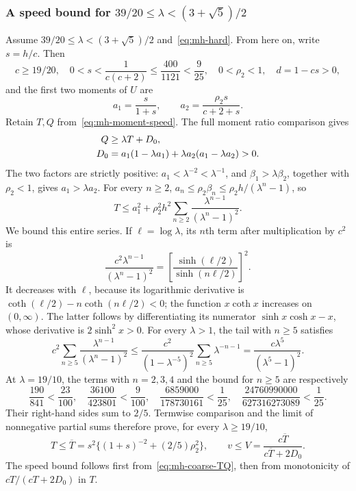 \subsubsection{A speed bound for \texorpdfstring{$39/20\le\lambda<(3+\sqrt5)/2$}{39/20 <= lambda < (3+sqrt(5))/2}}
Assume $39/20\le\lambda<(3+\sqrt5)/2$ and~\eqref{eq:mh-hard}. From here on, write $s=h/c$. Then
\begin{equation}\label{eq:mh-coarse-domain}
 c\ge19/20,\quad
 0<s<\frac1{c(c+2)}\le\frac{400}{1121}<\frac9{25},\quad
 0<\rho_2<1,\quad d=1-cs>0,
\end{equation}
and the first two moments of $U$ are
\[
 a_1=\frac{s}{1+s},\qquad a_2=\frac{\rho_2s}{c+2+s}.
\]
Retain $T,Q$ from~\eqref{eq:mh-moment-speed}. The full moment ratio comparison gives
\begin{align}\label{eq:mh-coarse-TQ}
 Q&\ge\lambda T+D_0,\notag\\
 D_0&=a_1(1-\lambda a_1)+\lambda a_2(a_1-\lambda a_2)>0.
\end{align}
The two factors are strictly positive: $a_1<\lambda^{-2}<\lambda^{-1}$, and $\beta_1>\lambda\beta_2$, together with $\rho_2<1$, gives $a_1>\lambda a_2$. For every $n\ge2$, $a_n\le\rho_2\beta_n\le\rho_2h/(\lambda^n-1)$, so
\[
 T\le a_1^2+\rho_2^2h^2\sum_{n\ge2}\frac{\lambda^{n-1}}{(\lambda^n-1)^2}.
\]
We bound this entire series. If $\ell=\log\lambda$, its $n$th term after multiplication by $c^2$ is
\[
 \frac{c^2\lambda^{n-1}}{(\lambda^n-1)^2}
 =\left[\frac{\sinh(\ell/2)}{\sinh(n\ell/2)}\right]^2.
\]
It decreases with $\ell$, because its logarithmic derivative is
$\coth(\ell/2)-n\coth(n\ell/2)<0$; the function $x\coth x$ increases on $(0,\infty)$. The latter follows by differentiating its numerator $\sinh x\cosh x-x$, whose derivative is $2\sinh^2x>0$.
For every $\lambda>1$, the tail with $n\ge5$ satisfies
\[
 c^2\sum_{n\ge5}\frac{\lambda^{n-1}}{(\lambda^n-1)^2}
 \le\frac{c^2}{(1-\lambda^{-5})^2}\sum_{n\ge5}\lambda^{-n-1}
 =\frac{c\lambda^5}{(\lambda^5-1)^2}.
\]
At $\lambda=19/10$, the terms with $n=2,3,4$ and the bound for $n\ge5$ are respectively
\[
 \frac{190}{841}<\frac{23}{100},\quad
 \frac{36100}{423801}<\frac9{100},\quad
 \frac{6859000}{178730161}<\frac1{25},\quad
 \frac{24760990000}{627316273089}<\frac1{25}.
\]
Their right-hand sides sum to $2/5$. Termwise comparison and the limit of nonnegative partial sums therefore prove, for every $\lambda\ge19/10$,
\begin{equation}\label{eq:mh-coarse-V}
 T\le\overline T=s^2\{(1+s)^{-2}+(2/5)\rho_2^2\},\qquad
 v\le V=\frac{c\overline T}{c\overline T+2D_0}.
\end{equation}
The speed bound follows first from~\eqref{eq:mh-coarse-TQ}, then from monotonicity of $cT/(cT+2D_0)$ in $T$.

